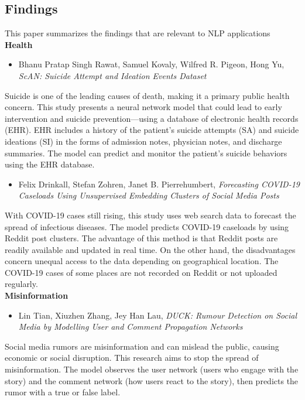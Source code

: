 \documentclass[11pt]{article}
\begin{document}
\subsection{Findings}
This paper summarizes the findings that are relevant to NLP applications
\\[12pt]
\noindent
\textbf{Health}
\begin{itemize}
\item Bhanu Pratap Singh Rawat, Samuel Kovaly, Wilfred R. Pigeon, Hong Yu, \emph{ScAN: Suicide Attempt and Ideation Events Dataset}
\end{itemize}
Suicide is one of the leading causes of death, making it a primary public health concern. This study presents a neural network model that could lead to early intervention and suicide prevention—using a database of electronic health records (EHR). EHR includes a history of the patient’s suicide attempts (SA) and suicide ideations (SI) in the forms of admission notes, physician notes, and discharge summaries. The model can predict and monitor the patient’s suicide behaviors using the EHR database.

\begin{itemize}
\item Felix Drinkall, Stefan Zohren, Janet B. Pierrehumbert, \emph{Forecasting COVID-19 Caseloads Using Unsupervised Embedding Clusters of Social Media Posts}
\end{itemize}
With COVID-19 cases still rising, this study uses web search data to forecast the spread of infectious diseases. The model predicts COVID-19 caseloads by using Reddit post clusters. The advantage of this method is that Reddit posts are readily available and updated in real time. On the other hand, the disadvantages concern unequal access to the data depending on geographical location. The COVID-19 cases of some places are not recorded on Reddit or not uploaded regularly. 
\\[12pt]
\noindent
\textbf{Misinformation}
\begin{itemize}
\item Lin Tian, Xiuzhen Zhang, Jey Han Lau, \emph{DUCK: Rumour Detection on Social Media by Modelling User and Comment Propagation Networks}
\end{itemize}
Social media rumors are misinformation and can mislead the public, causing economic or social disruption. This research aims to stop the spread of misinformation. The model observes the user network (users who engage with the story) and the comment network (how users react to the story), then predicts the rumor with a true or false label.
\end{document}
